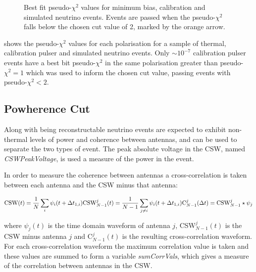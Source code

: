 \begin{figure}[htpb]
  \hfill
  \caption{Best fit pseudo-$\chi^{2}$ values for minimum bias, calibration and simulated neutrino events. Events are passed when the pseudo-$\chi^{2}$ falls below the chosen cut value of 2, marked by the orange arrow.}
  \label{fig:Analysis:Thermal-Cuts:Pseudo-ChiSq}
\end{figure}
  
 shows the pseudo-$\chi^{2}$ values for each polarisation for a sample of thermal, calibration pulser and simulated neutrino events. Only $\sim 10^{-7}$ calibration pulser events have a best bit pseudo-$\chi^{2}$ in the same polarisation greater than pseudo-$\chi^{2}=1$ which was used to inform the chosen cut value, passing events with pseudo-$\chi^{2} < 2$. 

\subsection{Powherence Cut}
\label{sec:Analysis:Thermal-Cuts:Powherence}

Along with being reconstructable neutrino events are expected to exhibit non-thermal levels of power and coherence between antennas, and can be used to separate the two types of event. The peak absolute voltage in the CSW, named \textit{CSWPeakVoltage}, is used a measure of the power in the event. 

In order to measure the coherence between antennas a cross-correlation is taken between each antenna and the CSW minus that antenna:

\begin{equation}
  \mbox{CSW}(t) = \frac{1}{N}\sum_{i} \psi_{i}(t+\Delta t_{1,i})\\
  \mbox{CSW}_{N-1}^{j}(t) = \frac{1}{N-1}\sum_{j \neq i} \psi_{i}(t+\Delta t_{1,i})\\
  \mbox{C}_{N-1}^{j}(\Delta t) = {\mbox{CSW}_{N-1}^{j} \star \psi_{j}}
\end{equation}

\noindent where $\psi_{j}(t)$ is the time domain waveform of antenna $j$, CSW$_{N-1}^{j}(t)$ is the CSW minus antenna $j$ and C$_{N-1}^{j}(t)$ is the resulting cross-correlation waveform. For each cross-correlation waveform the maximum correlation value is taken and these values are summed to form a variable \textit{sumCorrVals}, which gives a measure of the correlation between antennas in the CSW.

